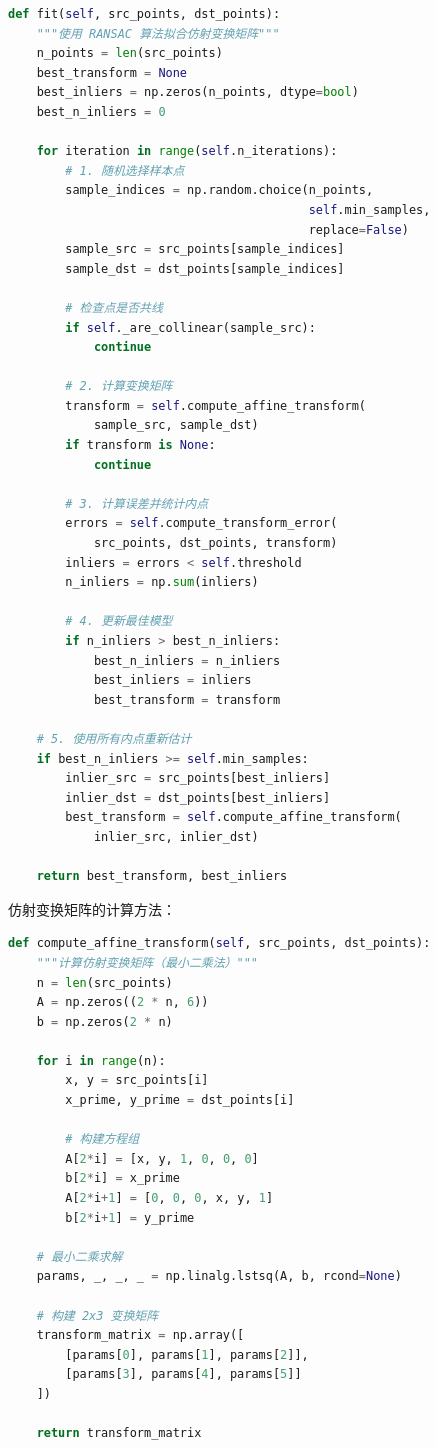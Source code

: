 \documentclass[a4paper]{article}
\begin{document}
\begin{lstlisting}[language=Python, caption=RANSAC算法实现]
def fit(self, src_points, dst_points):
    """使用 RANSAC 算法拟合仿射变换矩阵"""
    n_points = len(src_points)
    best_transform = None
    best_inliers = np.zeros(n_points, dtype=bool)
    best_n_inliers = 0
    
    for iteration in range(self.n_iterations):
        # 1. 随机选择样本点
        sample_indices = np.random.choice(n_points,
                                          self.min_samples,
                                          replace=False)
        sample_src = src_points[sample_indices]
        sample_dst = dst_points[sample_indices]
        
        # 检查点是否共线
        if self._are_collinear(sample_src):
            continue
        
        # 2. 计算变换矩阵
        transform = self.compute_affine_transform(
            sample_src, sample_dst)
        if transform is None:
            continue
        
        # 3. 计算误差并统计内点
        errors = self.compute_transform_error(
            src_points, dst_points, transform)
        inliers = errors < self.threshold
        n_inliers = np.sum(inliers)
        
        # 4. 更新最佳模型
        if n_inliers > best_n_inliers:
            best_n_inliers = n_inliers
            best_inliers = inliers
            best_transform = transform
    
    # 5. 使用所有内点重新估计
    if best_n_inliers >= self.min_samples:
        inlier_src = src_points[best_inliers]
        inlier_dst = dst_points[best_inliers]
        best_transform = self.compute_affine_transform(
            inlier_src, inlier_dst)
    
    return best_transform, best_inliers
\end{lstlisting}

仿射变换矩阵的计算方法：

\begin{lstlisting}[language=Python, caption=仿射变换矩阵计算]
def compute_affine_transform(self, src_points, dst_points):
    """计算仿射变换矩阵（最小二乘法）"""
    n = len(src_points)
    A = np.zeros((2 * n, 6))
    b = np.zeros(2 * n)
    
    for i in range(n):
        x, y = src_points[i]
        x_prime, y_prime = dst_points[i]
        
        # 构建方程组
        A[2*i] = [x, y, 1, 0, 0, 0]
        b[2*i] = x_prime
        A[2*i+1] = [0, 0, 0, x, y, 1]
        b[2*i+1] = y_prime
    
    # 最小二乘求解
    params, _, _, _ = np.linalg.lstsq(A, b, rcond=None)
    
    # 构建 2x3 变换矩阵
    transform_matrix = np.array([
        [params[0], params[1], params[2]],
        [params[3], params[4], params[5]]
    ])
    
    return transform_matrix
\end{lstlisting}
\end{document}
